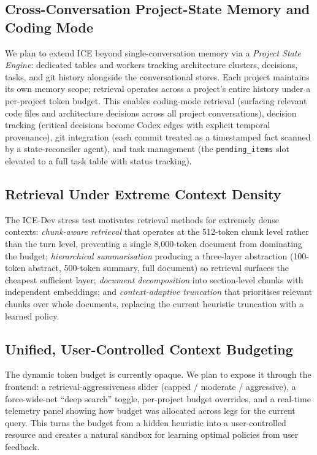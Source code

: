 \documentclass[11pt,a4paper]{article}
\begin{document}
\subsection{Cross-Conversation Project-State Memory and Coding Mode}
We plan to extend ICE beyond single-conversation memory via a \emph{Project State Engine}: dedicated tables and workers tracking architecture clusters, decisions, tasks, and git history alongside the conversational stores. Each project maintains its own memory scope; retrieval operates across a project's entire history under a per-project token budget. This enables coding-mode retrieval (surfacing relevant code files and architecture decisions across all project conversations), decision tracking (critical decisions become Codex edges with explicit temporal provenance), git integration (each commit treated as a timestamped fact scanned by a state-reconciler agent), and task management (the \texttt{pending\_items} slot elevated to a full task table with status tracking).

\subsection{Retrieval Under Extreme Context Density}
The ICE-Dev stress test motivates retrieval methods for extremely dense contexts: \emph{chunk-aware retrieval} that operates at the 512-token chunk level rather than the turn level, preventing a single 8{,}000-token document from dominating the budget; \emph{hierarchical summarisation} producing a three-layer abstraction (100-token abstract, 500-token summary, full document) so retrieval surfaces the cheapest sufficient layer; \emph{document decomposition} into section-level chunks with independent embeddings; and \emph{context-adaptive truncation} that prioritises relevant chunks over whole documents, replacing the current heuristic truncation with a learned policy.

\subsection{Unified, User-Controlled Context Budgeting}
The dynamic token budget is currently opaque. We plan to expose it through the frontend: a retrieval-aggressiveness slider (capped / moderate / aggressive), a force-wide-net ``deep search'' toggle, per-project budget overrides, and a real-time telemetry panel showing how budget was allocated across legs for the current query. This turns the budget from a hidden heuristic into a user-controlled resource and creates a natural sandbox for learning optimal policies from user feedback.
\end{document}

